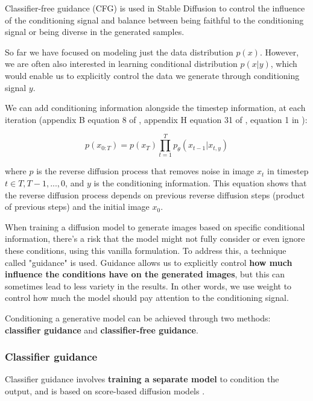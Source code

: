 \label{subsec:classifier_free_diffusion_guidance}

Classifier-free guidance (CFG) is used in Stable Diffusion to control the influence of the conditioning signal and balance between being faithful to the conditioning signal or being diverse in the generated samples.

So far we have focused on modeling just the data distribution $p(x)$. However, we are often also interested in learning conditional distribution $p(x|y)$, which would enable us to explicitly control the data we generate through conditioning signal $y$.

We can add conditioning information alongside the timestep information, at each iteration (appendix B equation 8 of \cite{ddpm}, appendix H equation 31 of \cite{openai_diffusion_beats_gans}, equation 1 in \cite{ddim}):

\[
p(x_{0:T}) = p(x_T) \prod_{t=1}^{T} p_\theta (x_{t-1} | x_{t, y})
\]

where $p$ is the reverse diffusion process that removes noise in image $x_t$ in timestep $t \in {T, T-1, ..., 0}$, and $y$ is the conditioning information. This equation shows that the reverse diffusion process depends on previous reverse diffusion steps (product of previous steps) and the initial image $x_0$.

When training a diffusion model to generate images based on specific conditional information, there's a risk that the model might not fully consider or even ignore these conditions, using this vanilla formulation. To address this, a technique called "guidance" is used. Guidance allows us to explicitly control \textbf{how much influence the conditions have on the generated images}, but this can sometimes lead to less variety in the results. In other words, we use weight to control how much the model should pay attention to the conditioning signal.


Conditioning a generative model can be achieved through two methods: \textbf{classifier guidance} and \textbf{classifier-free guidance}. 







\subsubsection*{Classifier guidance}

Classifier guidance \cite{openai_diffusion_beats_gans} involves \textbf{training a separate model} to condition the output, and is based on score-based diffusion models \cite{score_based_generative_modeling}. 

